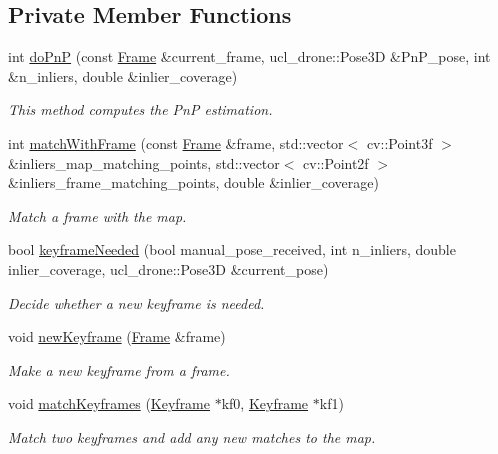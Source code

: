 \subsection*{Private Member Functions}
\begin{DoxyCompactItemize}
\item 
int \hyperlink{classMap_adcf461a96fe117cb8273a524b03bcd26}{do\+PnP} (const \hyperlink{structFrame}{Frame} \&current\+\_\+frame, ucl\+\_\+drone\+::\+Pose3D \&Pn\+P\+\_\+pose, int \&n\+\_\+inliers, double \&inlier\+\_\+coverage)
\begin{DoxyCompactList}\small\item\em This method computes the PnP estimation. \end{DoxyCompactList}\item 
int \hyperlink{classMap_a2d773b1af5301314878d0c84482976d0}{match\+With\+Frame} (const \hyperlink{structFrame}{Frame} \&frame, std\+::vector$<$ cv\+::\+Point3f $>$ \&inliers\+\_\+map\+\_\+matching\+\_\+points, std\+::vector$<$ cv\+::\+Point2f $>$ \&inliers\+\_\+frame\+\_\+matching\+\_\+points, double \&inlier\+\_\+coverage)
\begin{DoxyCompactList}\small\item\em Match a frame with the map. \end{DoxyCompactList}\item 
bool \hyperlink{classMap_add1699053ae7e04cd83c897d3791bef5}{keyframe\+Needed} (bool manual\+\_\+pose\+\_\+received, int n\+\_\+inliers, double inlier\+\_\+coverage, ucl\+\_\+drone\+::\+Pose3D \&current\+\_\+pose)
\begin{DoxyCompactList}\small\item\em Decide whether a new keyframe is needed. \end{DoxyCompactList}\item 
\mbox{\label{classMap_aea46eb87782d2a4809bbd0fe80916257}} 
void \hyperlink{classMap_aea46eb87782d2a4809bbd0fe80916257}{new\+Keyframe} (\hyperlink{structFrame}{Frame} \&frame)
\begin{DoxyCompactList}\small\item\em Make a new keyframe from a frame. \end{DoxyCompactList}\item 
void \hyperlink{classMap_ade3c9580af4b73c0468947f04def9930}{match\+Keyframes} (\hyperlink{classKeyframe}{Keyframe} $\ast$kf0, \hyperlink{classKeyframe}{Keyframe} $\ast$kf1)
\begin{DoxyCompactList}\small\item\em Match two keyframes and add any new matches to the map. \end{DoxyCompactList}\item 

\end{DoxyCompactItemize}
